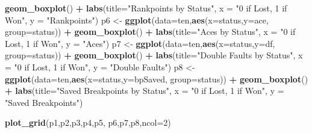 \documentclass[]{article}
\newenvironment{Shaded}{\begin{snugshade}}{\end{snugshade}}
\newcommand{\DataTypeTok}[1]{\textcolor[rgb]{0.13,0.29,0.53}{#1}}
\newcommand{\DecValTok}[1]{\textcolor[rgb]{0.00,0.00,0.81}{#1}}
\newcommand{\KeywordTok}[1]{\textcolor[rgb]{0.13,0.29,0.53}{\textbf{#1}}}
\newcommand{\NormalTok}[1]{#1}
\newcommand{\OperatorTok}[1]{\textcolor[rgb]{0.81,0.36,0.00}{\textbf{#1}}}
\newcommand{\StringTok}[1]{\textcolor[rgb]{0.31,0.60,0.02}{#1}}
\begin{document}
\begin{Shaded}
\begin{Highlighting}[]
\StringTok{  }\KeywordTok{geom_boxplot}\NormalTok{() }\OperatorTok{+}\StringTok{ }
\StringTok{  }\KeywordTok{labs}\NormalTok{(}\DataTypeTok{title=}\StringTok{"Rankpoints by Status"}\NormalTok{,}
       \DataTypeTok{x =} \StringTok{"0 if Lost, 1 if Won"}\NormalTok{,}
       \DataTypeTok{y =} \StringTok{"Rankpoints"}\NormalTok{)}
\NormalTok{p6 <-}\StringTok{ }\KeywordTok{ggplot}\NormalTok{(}\DataTypeTok{data=}\NormalTok{ten,}\KeywordTok{aes}\NormalTok{(}\DataTypeTok{x=}\NormalTok{status,}\DataTypeTok{y=}\NormalTok{ace, }\DataTypeTok{group=}\NormalTok{status)) }\OperatorTok{+}
\StringTok{  }\KeywordTok{geom_boxplot}\NormalTok{() }\OperatorTok{+}\StringTok{ }
\StringTok{  }\KeywordTok{labs}\NormalTok{(}\DataTypeTok{title=}\StringTok{"Aces by Status"}\NormalTok{,}
       \DataTypeTok{x =} \StringTok{"0 if Lost, 1 if Won"}\NormalTok{,}
       \DataTypeTok{y =} \StringTok{"Aces"}\NormalTok{)}
\NormalTok{p7 <-}\StringTok{ }\KeywordTok{ggplot}\NormalTok{(}\DataTypeTok{data=}\NormalTok{ten,}\KeywordTok{aes}\NormalTok{(}\DataTypeTok{x=}\NormalTok{status,}\DataTypeTok{y=}\NormalTok{df, }\DataTypeTok{group=}\NormalTok{status)) }\OperatorTok{+}
\StringTok{  }\KeywordTok{geom_boxplot}\NormalTok{() }\OperatorTok{+}\StringTok{ }
\StringTok{  }\KeywordTok{labs}\NormalTok{(}\DataTypeTok{title=}\StringTok{"Double Faults by Status"}\NormalTok{,}
       \DataTypeTok{x =} \StringTok{"0 if Lost, 1 if Won"}\NormalTok{,}
       \DataTypeTok{y =} \StringTok{"Double Faults"}\NormalTok{)}
\NormalTok{p8 <-}\StringTok{ }\KeywordTok{ggplot}\NormalTok{(}\DataTypeTok{data=}\NormalTok{ten,}\KeywordTok{aes}\NormalTok{(}\DataTypeTok{x=}\NormalTok{status,}\DataTypeTok{y=}\NormalTok{bpSaved, }\DataTypeTok{group=}\NormalTok{status)) }\OperatorTok{+}
\StringTok{  }\KeywordTok{geom_boxplot}\NormalTok{() }\OperatorTok{+}\StringTok{ }
\StringTok{  }\KeywordTok{labs}\NormalTok{(}\DataTypeTok{title=}\StringTok{"Saved Breakpoints by Status"}\NormalTok{,}
       \DataTypeTok{x =} \StringTok{"0 if Lost, 1 if Won"}\NormalTok{,}
       \DataTypeTok{y =} \StringTok{"Saved Breakpoints"}\NormalTok{)}

\KeywordTok{plot_grid}\NormalTok{(p1,p2,p3,p4,p5,}
\NormalTok{          p6,p7,p8,}\DataTypeTok{ncol=}\DecValTok{2}\NormalTok{)}
\end{Highlighting}
\end{Shaded}
\end{document}
